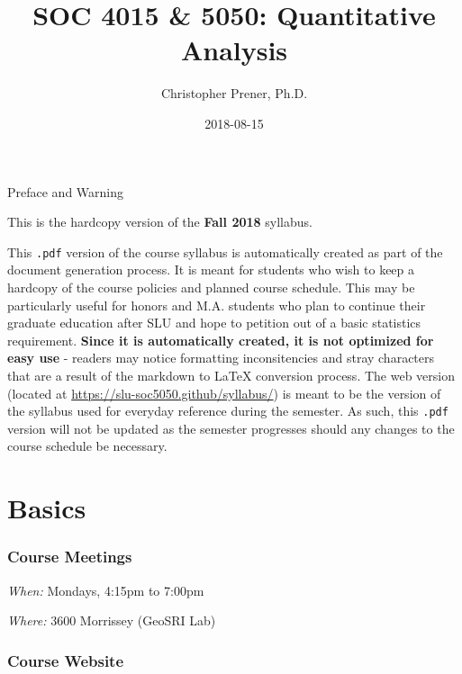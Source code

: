 \documentclass[]{book}
\title{SOC 4015 \& 5050: Quantitative Analysis}
\author{Christopher Prener, Ph.D.}
\date{2018-08-15}
\theoremstyle{definition}
\theoremstyle{definition}
\theoremstyle{definition}
\theoremstyle{remark}
\begin{document}
\maketitle

\begin{center}
{\huge Preface and Warning} \\
\end{center}
\vspace{5mm}
This is the hardcopy version of the \textbf{Fall 2018} syllabus.
\vspace{5mm}
\par \noindent This \texttt{.pdf} version of the course syllabus is automatically created as part of the document generation process. It is meant for students who wish to keep a hardcopy of the course policies and planned course schedule. This may be particularly useful for honors and M.A. students who plan to continue their graduate education after SLU and hope to petition out of a basic statistics requirement. \textbf{Since it is automatically created, it is not optimized for easy use} - readers may notice formatting inconsitencies and stray characters that are a result of the markdown to \LaTeX{} conversion process. The web version (located at \href{https://slu-soc5050.github/syllabus/}{https://slu-soc5050.github/syllabus/}) is meant to be the version of the syllabus used for everyday reference during the semester. As such, this \texttt{.pdf} version will not be updated as the semester progresses should any changes to the course schedule be necessary.

\hypertarget{basics}{%
\chapter*{Basics}\label{basics}}

\hypertarget{course-meetings}{%
\subsection*{Course Meetings}\label{course-meetings}}

\emph{When:} Mondays, 4:15pm to 7:00pm

\emph{Where:} 3600 Morrissey (GeoSRI Lab)

\hypertarget{course-website}{%
\subsection*{Course Website}\label{course-website}}
\end{document}
